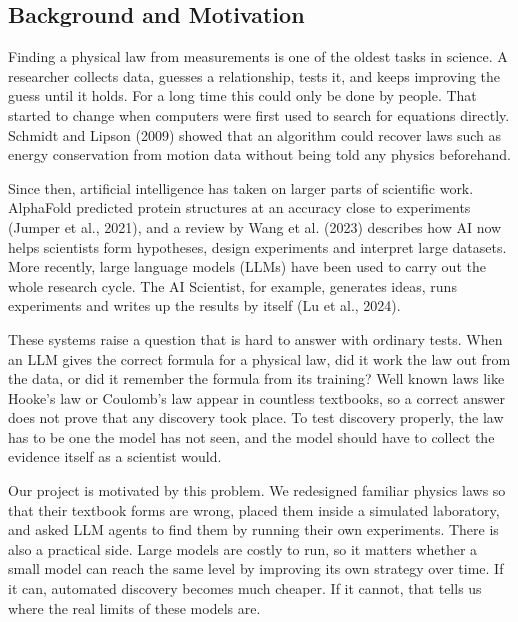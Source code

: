 \subsection{Background and Motivation}

Finding a physical law from measurements is one of the oldest tasks in science. A researcher collects data, guesses a relationship, tests it, and keeps improving the guess until it holds. For a long time this could only be done by people. That started to change when computers were first used to search for equations directly. Schmidt and Lipson (2009) showed that an algorithm could recover laws such as energy conservation from motion data without being told any physics beforehand.

Since then, artificial intelligence has taken on larger parts of scientific work. AlphaFold predicted protein structures at an accuracy close to experiments (Jumper et al., 2021), and a review by Wang et al. (2023) describes how AI now helps scientists form hypotheses, design experiments and interpret large datasets. More recently, large language models (LLMs) have been used to carry out the whole research cycle. The AI Scientist, for example, generates ideas, runs experiments and writes up the results by itself (Lu et al., 2024).

These systems raise a question that is hard to answer with ordinary tests. When an LLM gives the correct formula for a physical law, did it work the law out from the data, or did it remember the formula from its training? Well known laws like Hooke's law or Coulomb's law appear in countless textbooks, so a correct answer does not prove that any discovery took place. To test discovery properly, the law has to be one the model has not seen, and the model should have to collect the evidence itself as a scientist would.

Our project is motivated by this problem. We redesigned familiar physics laws so that their textbook forms are wrong, placed them inside a simulated laboratory, and asked LLM agents to find them by running their own experiments. There is also a practical side. Large models are costly to run, so it matters whether a small model can reach the same level by improving its own strategy over time. If it can, automated discovery becomes much cheaper. If it cannot, that tells us where the real limits of these models are.
